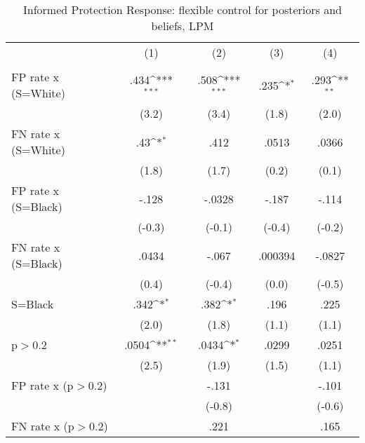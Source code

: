 \begin{table}[htbp]\centering
\def\sym#1{\ifmmode^{#1}\else\(^{#1}\)\fi}
\caption{Informed Protection Response: flexible control for posteriors and beliefs, LPM}
\begin{tabular}{l*{4}{c}}
\hline\hline
                &\multicolumn{1}{c}{(1)}&\multicolumn{1}{c}{(2)}&\multicolumn{1}{c}{(3)}&\multicolumn{1}{c}{(4)}\\
                &\multicolumn{1}{c}{}&\multicolumn{1}{c}{}&\multicolumn{1}{c}{}&\multicolumn{1}{c}{}\\
\hline
FP rate x (S=White)&     .434\sym{***}&     .508\sym{***}&     .235\sym{*}  &     .293\sym{**} \\
                &    (3.2)         &    (3.4)         &    (1.8)         &    (2.0)         \\
FN rate x (S=White)&      .43\sym{*}  &     .412         &    .0513         &    .0366         \\
                &    (1.8)         &    (1.7)         &    (0.2)         &    (0.1)         \\
FP rate x (S=Black)&    -.128         &   -.0328         &    -.187         &    -.114         \\
                &   (-0.3)         &   (-0.1)         &   (-0.4)         &   (-0.2)         \\
FN rate x (S=Black)&    .0434         &    -.067         &  .000394         &   -.0827         \\
                &    (0.4)         &   (-0.4)         &    (0.0)         &   (-0.5)         \\
S=Black         &     .342\sym{*}  &     .382\sym{*}  &     .196         &     .225         \\
                &    (2.0)         &    (1.8)         &    (1.1)         &    (1.1)         \\
p$>$0.2         &    .0504\sym{**} &    .0434\sym{*}  &    .0299         &    .0251         \\
                &    (2.5)         &    (1.9)         &    (1.5)         &    (1.1)         \\
FP rate x (p$>$0.2)&                  &    -.131         &                  &    -.101         \\
                &                  &   (-0.8)         &                  &   (-0.6)         \\
FN rate x (p$>$0.2)&                  &     .221         &                  &     .165         \\

\end{tabular}
\end{table}
